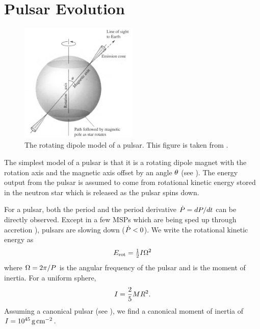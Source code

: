 \section{Pulsar Evolution}

\begin{figure}[htbp]
  \centering
    \includegraphics[width=0.5\textwidth]{chapters/pulsar_pwn_system/figures/pulsar_model.pdf}
    \caption{The rotating dipole model of a pulsar. This figure is taken
    from \citep{carroll_2006_introduction-modern}.}
\end{figure}

The simplest model of a pulsar is that it is a rotating dipole magnet
with the rotation axis and the magnetic axis offset by an angle
$\theta$ (see ).  The energy output
from the pulsar is assumed to come from rotational kinetic energy
stored in the neutron star which is released as the pulsar spins down.

For a pulsar, both the period \period and the period derivative
$\dot{P}=dP/dt$ can be directly observed.  Except in a
few \acp{MSP} which are being sped up through accretion \cite[see for
example][]{falanga_2005_integral-observations}), pulsars are slowing down
($\dot{P}<0$).  We write the rotational kinetic energy as
\begin{equation}\eqnlabel{rotational_energy}
  \energyrotational = \tfrac{1}{2} I \PulsarAngularFrequency^2
\end{equation}
where $\Omega = 2\pi/P$ is the angular frequency
of the pulsar and \momentofinertia is the moment of inertia.
For a uniform sphere,
\begin{equation}
  I = \frac{2}{5} M R^2.
\end{equation}
Assuming a canonical pulsar (see ),
we find a canonical moment of inertia of
$I=10^{45}\,\text{g}\,\text{cm}^{-2}$.


